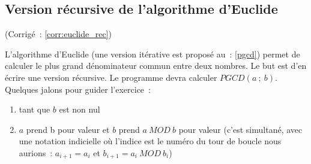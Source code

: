	\subsection{Version récursive de l'algorithme d'Euclide} \label{appl:euclide_rec} (Corrigé~: \ref{corr:euclide_rec})
	
		L'algorithme d'Euclide (une version itérative est proposé au~: \ref{pgcd}) permet de calculer le plus grand dénominateur commun entre deux nombres. Le but est d'en écrire une version récursive. Le programme devra calculer $PGCD(a~;\ b)$. Quelques jalons pour guider l'exercice~:
		\begin{enumerate}
			\item tant que $b$ est non nul
			\item $a$ prend b pour valeur et $b$ prend $a\ MOD\ b$ pour valeur (c'est simultané, avec une notation indicielle où l'indice est le numéro du tour de boucle nous aurions~: $a_{i+1} = a_i$ et $b_{i+1} = a_i\ MOD\ b_i$)
		\end{enumerate}

		
			
		
		
